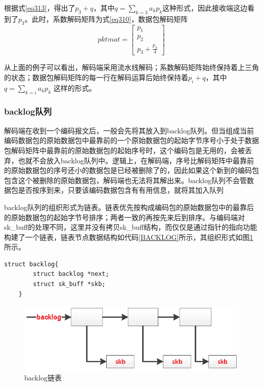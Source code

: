 根据式\ref{eq313}，得出了$p_{3}+q$，其中$q=\sum\limits_{k = 3} {{a_k}{p_k}} $这种形式，因此接收端这边看到了$p_{3}$。此时，系数解码矩阵为式\ref{eq310}，数据包解码矩阵
\begin{equation}
pktmat = \left[ {\begin{array}{*{20}{c}}
	{{p_1}}\\
	{{p_2}}\\
	{{p_3} + \frac{{{p_4}}}{4}}
	\end{array}} \right]
\end{equation}
\par
从上面的例子可以看出，解码端采用流水线解码；系数解码矩阵始终保持着上三角的状态；数据包解码矩阵的每一行在解码运算后始终保持着$p_{i}+q$，其中$q=\sum\limits_{k = i} {{a_k}{p_k}} $ 这样的形式。
\subsubsection{\textbf{backlog队列}}
解码端在收到一个编码报文后，一般会先将其放入到backlog队列。但当组成当前编码数据包的原始数据包中最靠前的一个原始数据包的起始字节序号小于处于数据包解码矩阵中最靠前的原始数据包的起始序号时，这个编码包是无用的，会被丢弃，也就不会放入backlog队列中。逻辑上，在解码端，序号比解码矩阵中最靠前的原始数据包的序号还小的数据包是已经被删除了的，因此如果这个新到的编码包包含这个被删除的原始数据包，解码端也无法将其解出来。backlog队列不会管数据包是否按序到来，只要该编码数据包含有有用信息，就将其加入队列
\par
backlog队列的组织形式为链表。链表优先按构成编码包的原始数据包中的最靠后的原始数据包的起始字节号排序；两者一致的再按先来后到排序。与编码端对sk\_buff的处理不同，这里并没有拷贝sk\_buff结构，而仅仅是通过指针的指向功能构建了一个链表，链表节点数据结构如代码\ref{BACKLOG}所示，其组织形式如图\ref{BACKLOG_EPS}所示。
	\begin{lstlisting}[float,caption=backlog链表节点数据结构,label={BACKLOG},language={[ANSI]C}]
	struct backlog{
		struct backlog *next;
		struct sk_buff *skb;
	}
	\end{lstlisting}

\begin{figure}[htbp]
	\centering
	\includegraphics[width=5in]{figures/backlog.eps}
	\caption{backlog链表}
	\label{BACKLOG_EPS}
\end{figure}

